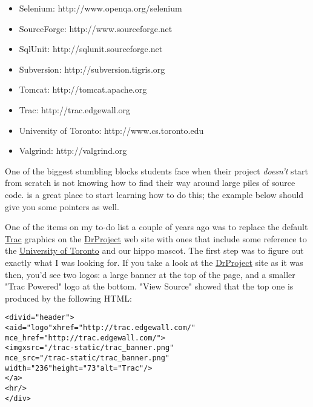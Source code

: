 \documentclass{report}
\begin{document}
\begin{itemize}
  \item Selenium: http://www.openqa.org/selenium

  \item SourceForge: http://www.sourceforge.net

  \item SqlUnit: http://sqlunit.sourceforge.net

  \item Subversion: http://subversion.tigris.org

  \item Tomcat: http://tomcat.apache.org

  \item Trac: http://trac.edgewall.org

  \item University of Toronto: http://www.cs.toronto.edu

  \item Valgrind: http://valgrind.org

\end{itemize}


One of the biggest stumbling blocks students face when their project
\emph{doesn't} start from scratch is not knowing how to find their way
around large piles of source code.  \cite{b:spinellis-reading} is a
great place to start learning how to do this; the example below should
give you some pointers as well.

One of the items on my to-do list a couple of years ago was to replace
the default \url{Trac} graphics on the \url{DrProject} web site with
ones that include some reference to the \url{University of Toronto}
and our hippo mascot.  The first step was to figure out exactly what I
was looking for.  If you take a look at the \url{DrProject} site as it
was then, you'd see two logos: a large banner at the top of the page,
and a smaller "Trac Powered" logo at the bottom.  "View Source" showed
that the top one is produced by the following HTML:

\begin{alltt}
<div id="header">
  <a id="logo" xhref="http://trac.edgewall.com/"
     mce_href="http://trac.edgewall.com/">
    <img xsrc="/trac-static/trac_banner.png"
         mce_src="/trac-static/trac_banner.png"
         width="236" height="73" alt="Trac"/>
  </a>
  <hr/>
</div>
\end{alltt}
\end{document}
